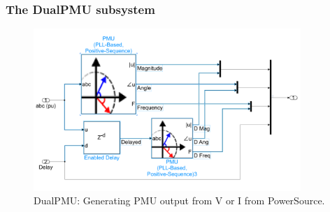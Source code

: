 \subsubsection{The DualPMU subsystem}

 \begin{figure}[ht]
\centering
\includegraphics[width=0.9\textwidth]{figures/DualPMUsubsystem.png}
\caption[DualPMU SIMULINK subsystem]{DualPMU: Generating PMU output from V or I from PowerSource.}

\end{figure}



